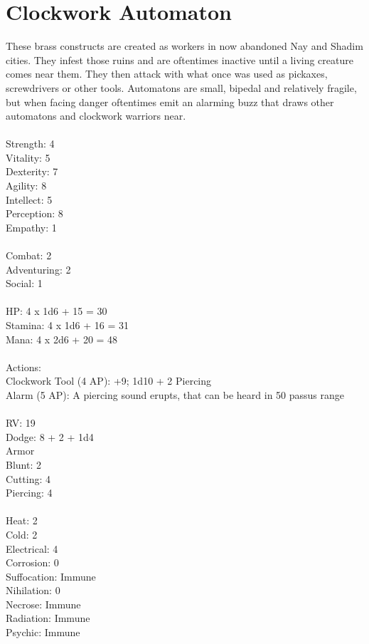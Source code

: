 \pagebreak
\section{Clockwork Automaton}

These brass constructs are created as workers in now abandoned Nay and Shadim cities. They infest those ruins and are oftentimes inactive until a living creature comes near them. They then attack with what once was used as pickaxes, screwdrivers or other tools.
Automatons are small, bipedal and relatively fragile, but when facing danger oftentimes emit an alarming buzz that draws other automatons and clockwork warriors near.\\
\\
Strength: 4\\
Vitality: 5\\
Dexterity: 7\\
Agility: 8\\
Intellect: 5\\
Perception: 8\\
Empathy: 1\\
\\
Combat: 2\\
Adventuring: 2\\
Social: 1\\
\\
HP: 4 x 1d6 + 15 = 30\\
Stamina: 4 x 1d6 + 16 = 31\\
Mana: 4 x 2d6 + 20 = 48\\
\\
Actions:\\
Clockwork Tool (4 AP): +9; 1d10 + 2 Piercing\\
Alarm (5 AP): A piercing sound erupts, that can be heard in 50 passus range\\
\\
RV: 19\\
Dodge: 8 + 2 + 1d4\\
Armor\\
Blunt: 2\\
Cutting: 4\\
Piercing: 4\\
\\
Heat: 2\\
Cold: 2\\
Electrical: 4\\
Corrosion: 0\\
Suffocation: Immune\\
Nihilation: 0\\
Necrose: Immune\\
Radiation: Immune\\
Psychic: Immune\\